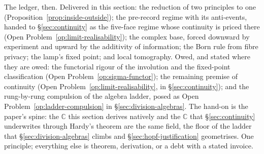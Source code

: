 The ledger, then. Delivered in this section: the reduction of two principles to one
(Proposition~\ref{prop:inside-outside}); the pre-record regime with its anti-events, handed to
\S\ref{sec:continuity} as the five-face regime whose continuity is priced there
(Open Problem~\ref{op:limit-realisability}); the complex base, forced downward by experiment and
upward by the additivity of information; the Born rule from fibre privacy; the lamp's fixed point;
and local tomography. Owed, and stated where they are owed: the functorial rigour of the involution
and the fixed-point classification (Open Problem~\ref{op:sigma-functor}); the remaining premise of continuity (Open Problem~\ref{op:limit-realisability}, in
\S\ref{sec:continuity}); and the
rung-by-rung compulsion of the algebra ladder, posed as Open
Problem~\ref{op:ladder-compulsion} in \S\ref{sec:division-algebras}. The
hand-on is the paper's spine: the $\mathbb{C}$ this section derives natively and the $\mathbb{C}$
that \S\ref{sec:continuity} underwrites through Hardy's theorem are the same field, the floor of
the ladder that \S\ref{sec:division-algebras} climbs and \S\ref{sec:hopf-justification}
geometrises. One principle; everything else is theorem, derivation, or a debt with a stated
invoice.
